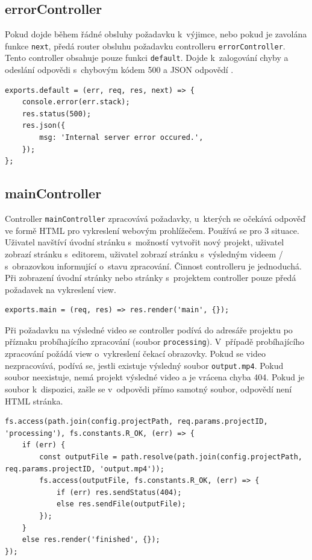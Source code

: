 \subsection{errorController}
Pokud dojde během řádné obsluhy požadavku k~výjimce, nebo pokud je zavolána funkce \texttt{next}, předá router obsluhu požadavku controlleru \texttt{errorController}. Tento controller obsahuje pouze funkci \texttt{default}. Dojde k~zalogování chyby a odeslání odpovědi s~chybovým kódem 500 a JSON odpovědí .
\begin{lstlisting}[style=JavaScript]
exports.default = (err, req, res, next) => {
    console.error(err.stack);
    res.status(500);
    res.json({
        msg: 'Internal server error occured.',
    });
};
\end{lstlisting}

\subsection{mainController}
Controller \texttt{mainController} zpracovává požadavky, u~kterých se očekává odpověď ve formě HTML pro vykreslení webovým prohlížečem. Používá se pro 3 situace. Uživatel navštíví úvodní stránku s~možností vytvořit nový projekt, uživatel zobrazí stránku s~editorem, uživatel zobrazí stránku s~výsledným videem / s~obrazovkou informující o~stavu zpracování. Činnost controlleru je jednoduchá. Při zobrazení úvodní stránky nebo stránky s~projektem controller pouze předá požadavek na vykreslení view.
\begin{lstlisting}[style=JavaScript]
exports.main = (req, res) => res.render('main', {});
\end{lstlisting}

Při požadavku na výsledné video se controller podívá do adresáře projektu po příznaku probíhajícího zpracování (soubor \texttt{processing}). V~případě probíhajícího zpracování požádá view o~vykreslení čekací obrazovky. Pokud se video nezpracovává, podívá se, jestli existuje výsledný soubor \texttt{output.mp4}. Pokud soubor neexistuje, nemá projekt výsledné video a je vrácena chyba 404. Pokud je soubor k~dispozici, zašle se v~odpovědi přímo samotný soubor, odpovědí není HTML stránka.
\begin{lstlisting}[style=JavaScript]
fs.access(path.join(config.projectPath, req.params.projectID, 'processing'), fs.constants.R_OK, (err) => {
    if (err) {
        const outputFile = path.resolve(path.join(config.projectPath, req.params.projectID, 'output.mp4'));
        fs.access(outputFile, fs.constants.R_OK, (err) => {
            if (err) res.sendStatus(404);
            else res.sendFile(outputFile);
        });
    }
    else res.render('finished', {});
});
\end{lstlisting}

